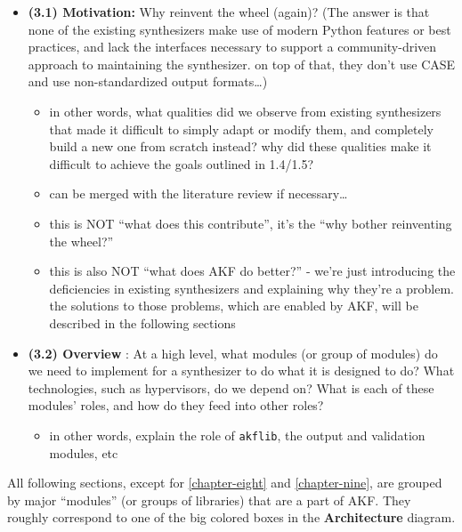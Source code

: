 \begin{itemize}
\tightlist
\item
  \textbf{(3.1) Motivation:} Why reinvent the wheel (again)? (The answer
  is that none of the existing synthesizers make use of modern Python
  features or best practices, and lack the interfaces necessary to
  support a community-driven approach to maintaining the synthesizer. on
  top of that, they don't use CASE and use non-standardized output
  formats\ldots)

  \begin{itemize}
  \tightlist
  \item
    in other words, what qualities did we observe from existing
    synthesizers that made it difficult to simply adapt or modify them,
    and completely build a new one from scratch instead? why did these
    qualities make it difficult to achieve the goals outlined in
    1.4/1.5?
  \item
    can be merged with the literature review if necessary\ldots{}
  \item
    this is NOT ``what does this contribute'', it's the ``why bother
    reinventing the wheel?''
  \item
    this is also NOT ``what does AKF do better?'' - we're just
    introducing the deficiencies in existing synthesizers and explaining
    why they're a problem. the solutions to those problems, which are
    enabled by AKF, will be described in the following sections
  \end{itemize}
\item
  \textbf{(3.2) Overview} : At a high level, what modules (or group of
  modules) do we need to implement for a synthesizer to do what it is
  designed to do? What technologies, such as hypervisors, do we depend
  on? What is each of these modules' roles, and how do they feed into
  other roles?

  \begin{itemize}
  \tightlist
  \item
    in other words, explain the role of \texttt{akflib}, the output and
    validation modules, etc
  \end{itemize}
\end{itemize}

All following sections, except for \autoref{chapter-eight} and
\autoref{chapter-nine}, are grouped by major ``modules'' (or groups
of libraries) that are a part of AKF. They roughly correspond to one of
the big colored boxes in the \textbf{Architecture} diagram.


